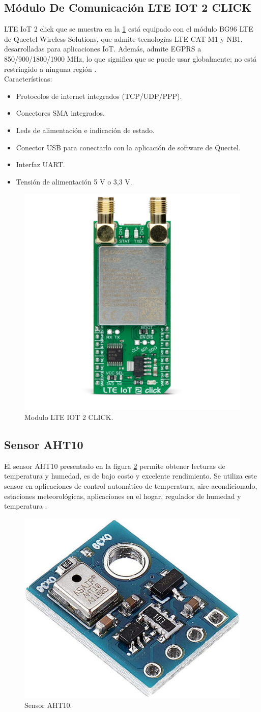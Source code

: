 \subsection{Módulo De Comunicación LTE IOT 2 CLICK}
\label{subsec:ejemplo}
LTE IoT 2 click que se muestra en la \ref{fig:modulo LTE IOT} está equipado con el módulo BG96 LTE de Quectel Wireless Solutions, que admite tecnologías LTE CAT M1 y NB1, desarrolladas para aplicaciones IoT. Además, admite EGPRS a 850/900/1800/1900 MHz, lo que significa que se puede usar globalmente; no está restringido a ninguna región \citep{MonuloLTE-IOT}.
\\Características:
\begin{itemize}
	\item Protocolos de internet integrados (TCP/UDP/PPP).
	\item Conectores SMA integrados.
	\item Leds de alimentación e indicación de estado.
	\item Conector USB para conectarlo con la aplicación de software de Quectel.
	\item Interfaz UART. 
	\item Tensión de alimentación 5 V o 3,3 V.

\end{itemize}


\begin{figure}[htbp]
	\centering
	\includegraphics[width=.4\textwidth]{./Figures/moduloBG96.jpg}
	\caption{Modulo LTE IOT 2 CLICK.}
	\label{fig:modulo LTE IOT}
\end{figure}

\subsection{Sensor AHT10}
El sensor AHT10 presentado en la figura \ref{fig:SensorAHT10} permite obtener lecturas de temperatura y humedad, es de bajo costo y excelente rendimiento. Se utiliza este sensor en aplicaciones de control automático de temperatura, aire acondicionado, estaciones meteorológicas, aplicaciones en el hogar, regulador de humedad y temperatura \citep{ModuloAHT10}.
\begin{figure}[htbp]
	\centering
	\includegraphics[width=.3\textwidth]{./Figures/aht10.jpg}
	\caption{Sensor AHT10.}
	\label{fig:SensorAHT10}
\end{figure}

